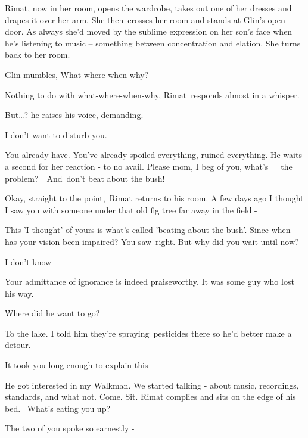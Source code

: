\documentclass[twoside,11pt]{book}
\begin{document}
Rimat, now in her room, opens the wardrobe, takes out one of her dresses and drapes it over her arm. She then\ crosses
her room and stands at Glin's open door. As always she'd moved by the sublime expression on her son's face when he's
listening to music -- something between concentration and elation. She turns back to her room.

Glin mumbles, {\textquotedbl}What-where-when{}-why?{\textquotedbl} 

{\textquotedbl}Nothing to do with what-where-when-why,{\textquotedbl} Rimat\ responds almost in a whisper. 

{\textquotedbl}But{\dots}?{\textquotedbl} he raises his voice, demanding. 

{\textquotedbl}I don't want to disturb you.{\textquotedbl} 

{\textquotedbl}You already have. You've already spoiled everything, ruined everything.{\textquotedbl} He waits a second
for her reaction - to no avail. {\textquotedbl}Please mom, I beg of you, what's\ \ \ the problem?\ \ And~don't beat
about the bush!{\textquotedbl}

{\textquotedbl}Okay, straight to the point,{\textquotedbl}\ Rimat returns to his room. {\textquotedbl}A few days ago I
thought I saw you with someone under that old fig tree far away in the field -{\textquotedbl} 

{\textquotedbl}This 'I thought' of yours is what's called {}'beating about the bush{}'. Since when has your vision been
impaired? You saw~right. But why did you wait until now?{\textquotedbl} 

{\textquotedbl}I don't know -{\textquotedbl} 

{\textquotedbl}Your admittance of ignorance is indeed praiseworthy. It was some guy who lost his way.{\textquotedbl} 

{\textquotedbl}Where did he want to go?{\textquotedbl} 

{\textquotedbl}To the lake. I told him they're spraying~pesticides there so he'd better make a detour.{\textquotedbl} 

{\textquotedbl}It took you long enough to explain this -{\textquotedbl} 

{\textquotedbl}He got interested in my Walkman. We started talking - about music, recordings, standards, and what not.
Come. Sit.{\textquotedbl} Rimat complies and sits on the edge of his bed.~ {\textquotedbl}What's eating you
up?{\textquotedbl} 

{\textquotedbl}The two of you spoke so earnestly -{\textquotedbl} 
\end{document}
